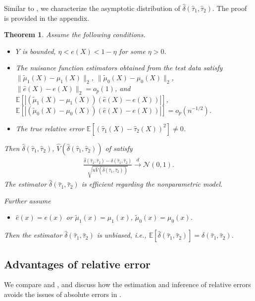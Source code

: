 \documentclass{article}
\theoremstyle{plain}
\newtheorem{theorem}{Theorem}[section]
\theoremstyle{definition}
\def\EE{\mathbb{E}}
\def\calN{\mathcal{N}}
\theoremstyle{plain}
\begin{document}
Similar to , we characterize the asymptotic distribution of $\hat{\delta}(\hat{\tau}_1, \hat{\tau}_2)$.
The proof is provided in the appendix.
\begin{theorem}\label{theo:relative.error}
    Assume the following conditions.
    \begin{itemize}
        \item [(a)] $Y$ is bounded, $\eta< e(X) < 1 - \eta$ for some $\eta > 0$.
        \item [(b)] The nuisance function estimators obtained from the test data satisfy $\|\tilde{\mu}_{1}(X) - \mu_1(X)\|_2$, $\|\tilde{\mu}_{0}(X) - \mu_0(X)\|_2$, $\|\hat{e}(X) - e(X)\|_2 = o_p(1)$, and $\EE[|(\tilde{\mu}_{1}(X) - \mu_1(X))(\hat{e}(X) - e(X))|]$, $\EE[|(\tilde{\mu}_{0}(X) - \mu_0(X))(\hat{e}(X) - e(X))|] = o_p(n^{-1/2})$.
        \item [(c)] The true relative error $\EE[(\hat{\tau}_1(X) - \hat{\tau}_2(X))^2] \neq 0$.
    \end{itemize}
    Then $\hat{\delta}(\hat{\tau}_1, \hat{\tau}_2)$, $\hat{V}(\hat{\delta}(\hat{\tau}_1, \hat{\tau}_2))$ of  satisfy
    \begin{align*}
        \frac{ \hat{\delta}(\hat{\tau}_1, \hat{\tau}_2) -     {\delta}(\hat{\tau}_1, \hat{\tau}_2)}{\sqrt{n\hat{V}(    \hat{\delta}(\hat{\tau}_1, \hat{\tau}_2))}}
        \stackrel{d}{\to} \calN(0,1).
    \end{align*}
    The estimator $\hat{\delta}(\hat{\tau}_1, \hat{\tau}_2)$ is efficient regarding the nonparametric model.

    Further assume
      \begin{itemize}
        \item [(d)] $\hat{e}(x) = e(x)$ or $\tilde{\mu}_{1}(x) = \mu_1(x)$, $\tilde{\mu}_{0}(x) = \mu_0(x)$.
    \end{itemize}
    Then the estimator $\hat{\delta}(\hat{\tau}_1, \hat{\tau}_2)$ is unbiased, i.e., $\EE\left[\hat{\delta}(\hat{\tau}_1, \hat{\tau}_2)\right]
        = {\delta}(\hat{\tau}_1, \hat{\tau}_2)$.
\end{theorem}



\subsection{Advantages of relative error}\label{sec:relative.error.advantage}

We compare  and , and discuss how the estimation and inference of relative errors avoids the issues of absolute errors in .
\end{document}
